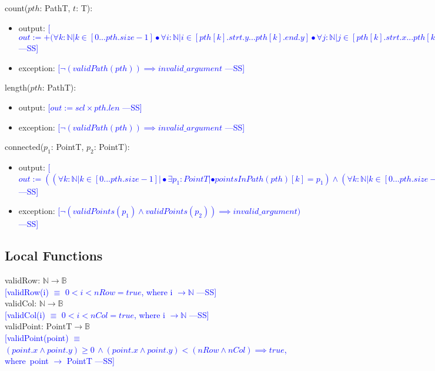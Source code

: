 \documentclass[12pt]{article}
\newcommand{\authornote}[3]{\textcolor{#1}{[#3 ---#2]}}
\newcommand{\authornote}[3]{}
\newcommand{\wss}[1]{\authornote{blue}{SS}{#1}}
\begin{document}
\noindent count($\mathit{pth}$: PathT, $t$: T):
\begin{itemize}
\item output: \wss{$out:= +(\forall k :\mathbb{N} | k \in [0...pth.size-1] \bullet \forall i : \mathbb{N} | i \in [pth[k].strt.y...pth[k].end.y] \bullet \forall j : \mathbb{N} | j \in [pth[k].strt.x...pth[k].end.x] \bullet s[i][j] = t : 1$}
\item exception: \wss{$\lnot(validPath(pth)) \implies invalid\_argument$}
\end{itemize}

\noindent length($\mathit{pth}$: PathT):
\begin{itemize}
\item output: \wss{$out := scl \times pth.len$}
\item exception: \wss{$\lnot(validPath(pth)) \implies invalid\_argument$}
\end{itemize}

\noindent connected($p_1$: PointT, $p_2$: PointT):
\begin{itemize}
\item output: \wss{$out := ((\forall k : \mathbb{N} | k \in [0...pth.size - 1] | \bullet \exists p_1 : PointT | \bullet pointsInPath(pth)[k] = p_1) \land (\forall k : \mathbb{N} | k \in [0...pth.size - 1] | \bullet \exists p_2 : PointT | \bullet pointsInPath(pth)[k] = p_2)) \implies true$}
\item exception: \wss{$\lnot(validPoints(p_1) \land validPoints(p_2)) \implies invalid\_argument)$}

\end{itemize}

\subsection*{Local Functions}

\noindent validRow: $\mathbb{N} \rightarrow \mathbb{B}$\\
\noindent \wss{validRow(i) $\equiv$ $0 < i < nRow = true$, where i $\rightarrow \mathbb{N}$}\\

\noindent validCol: $\mathbb{N} \rightarrow \mathbb{B}$\\
\noindent \wss{validCol(i) $\equiv$ $0 < i < nCol = true$, where i $\rightarrow \mathbb{N}$}\\

\noindent validPoint: $\mbox{PointT} \rightarrow \mathbb{B}$\\
\noindent \wss{validPoint(point) $\equiv$ $(point.x \land point.y) \geq 0\, \land (point.x \land point.y) < (nRow \land nCol) \implies true$,\, where\, point $\rightarrow$ PointT}\\
\end{document}

